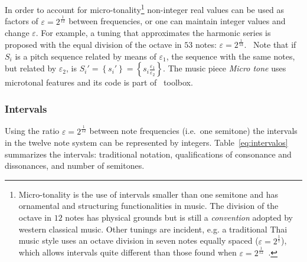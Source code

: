 In order to account for micro-tonality\footnote{Micro-tonality is the use of intervals smaller
than one semitone and has ornamental and structuring functionalities in music. The division of the octave in $12$ notes has physical grounds but is still a \emph{convention} adopted by western classical music. Other tunings are incident, e.g. a traditional Thai music style uses an octave division in seven notes equally spaced ($\varepsilon=2^{\frac{1}{7}}$),
which allows intervals quite different than those found when $\varepsilon=2^{\frac{1}{12}}$~\cite{Wisnick}.} non-integer real values can be used as factors of $\varepsilon=2^{\frac{1}{12}}$ between frequencies, or one can maintain integer values and change $\varepsilon$. For example, a tuning that approximates the harmonic series
is proposed with the equal division of the octave in $53$ notes:
$\varepsilon=2^{\frac{1}{53}}$.~\cite{microtonalidade}
Note that if $S_i$ is a pitch sequence related by means of $\varepsilon_1$, the sequence with the same notes, but related by $\varepsilon_2$, is 
$S_i'=\left\{s_i'\right\}=\left\{
s_i \frac{\varepsilon_1}{\varepsilon_2}\right\}$. The music piece \emph{Micro
tone} uses microtonal features and its code
is part of \massa\ toolbox.

\subsubsection{Intervals}\label{subsec:intervalos}
Using the ratio $\varepsilon=2^{\frac{1}{12}}$ between note frequencies (i.e.\ one semitone) the intervals in the twelve note system can be represented by integers. Table~\ref{eq:intervalos} summarizes the intervals: traditional notation, qualifications of consonance and
dissonances, and number of semitones.

